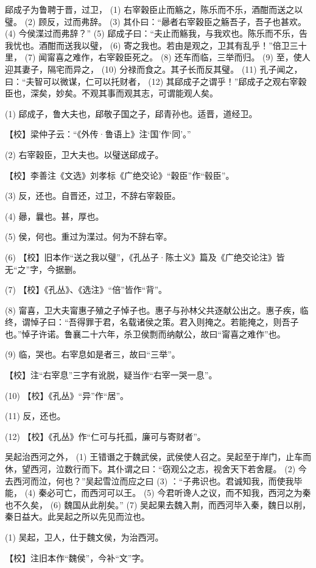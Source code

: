 \documentclass[12pt,UTF8]{ctexbook}
\begin{document}
郈成子为鲁聘于晋，过卫， (1) 右宰穀臣止而觞之，陈乐而不乐，酒酣而送之以璧。 (2) 顾反，过而弗辞。 (3) 其仆曰：“曏者右宰穀臣之觞吾子，吾子也甚欢。 (4) 今侯渫过而弗辞？” (5) 郈成子曰：“夫止而觞我，与我欢也。陈乐而不乐，告我忧也。酒酣而送我以璧， (6) 寄之我也。若由是观之，卫其有乱乎！”倍卫三十里， (7) 闻甯喜之难作，右宰穀臣死之。 (8) 还车而临，三举而归。 (9) 至，使人迎其妻子，隔宅而异之， (10) 分禄而食之。其子长而反其璧。 (11) 孔子闻之，曰：“夫智可以微谋，仁可以托财者， (12) 其郈成子之谓乎！”郈成子之观右宰穀臣也，深矣，妙矣。不观其事而观其志，可谓能观人矣。

(1) 郈成子，鲁大夫也，郈敬子国之子，郈青孙也。适晋，道经卫。

【校】梁仲子云：“《外传·鲁语上》注‘国’作‘同’。”

(2) 右宰穀臣，卫大夫也。以璧送郈成子。

【校】李善注《文选》刘孝标《广绝交论》“穀臣”作“毂臣”。

(3) 反，还也。自晋还，过卫，不辞右宰穀臣。

(4) 曏，曩也。甚，厚也。

(5) 侯，何也。重过为渫过。何为不辞右宰。

(6) 【校】旧本作“送之我以璧”，《孔丛子·陈士义》篇及《广绝交论注》皆无“之”字，今据删。

(7) 【校】《孔丛》、《选注》“倍”皆作“背”。

(8) 甯喜，卫大夫甯惠子殖之子悼子也。惠子与孙林父共逐献公出之。惠子疾，临终，谓悼子曰：“吾得罪于君，名载诸侯之策。君入则掩之。若能掩之，则吾子也。”悼子许诺。鲁襄二十六年，杀卫侯剽而纳献公，故曰“甯喜之难作”也。

(9) 临，哭也。右宰息如是者三，故曰“三举”。

【校】注“右宰息”三字有讹脱，疑当作“右宰一哭一息”。

(10) 【校】《孔丛》“异”作“居”。

(11) 反，还也。

(12) 【校】《孔丛》作“仁可与托孤，廉可与寄财者”。

吴起治西河之外， (1) 王错谮之于魏武侯，武侯使人召之。吴起至于岸门，止车而休，望西河，泣数行而下。其仆谓之曰：“窃观公之志，视舍天下若舍屣。 (2) 今去西河而泣，何也？”吴起雪泣而应之曰 (3) ：“子弗识也。君诚知我，而使我毕能， (4) 秦必可亡，而西河可以王。 (5) 今君听谗人之议，而不知我，西河之为秦也不久矣， (6) 魏国从此削矣。” (7) 吴起果去魏入荆，而西河毕入秦，魏日以削，秦日益大。此吴起之所以先见而泣也。

(1) 吴起，卫人，仕于魏文侯，为治西河。

【校】注旧本作“魏侯”，今补“文”字。
\end{document}
